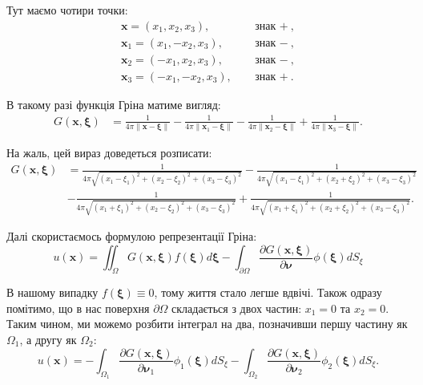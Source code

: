 \documentclass{hw_template}
\begin{document}
Тут маємо чотири точки:
\begin{align*}
    \mathbf{x} = (x_1,x_2,x_3), & \quad \text{знак $+$}, \\
    \mathbf{x}_1 = (x_1,-x_2,x_3), & \quad \text{знак $-$}, \\
    \mathbf{x}_2 = (-x_1,x_2,x_3), & \quad \text{знак $-$}, \\
    \mathbf{x}_3 = (-x_1,-x_2,x_3), & \quad \text{знак $+$}.
\end{align*}

В такому разі функція Гріна матиме вигляд:
\begin{align*}
    G(\mathbf{x}, \boldsymbol{\xi}) &= \frac{1}{4\pi\|\mathbf{x} - \boldsymbol{\xi}\|} - \frac{1}{4\pi\|\mathbf{x}_1 - \boldsymbol{\xi}\|} - \frac{1}{4\pi\|\mathbf{x}_2 - \boldsymbol{\xi}\|} + \frac{1}{4\pi\|\mathbf{x}_3 - \boldsymbol{\xi}\|}.
\end{align*}

На жаль, цей вираз доведеться розписати:
\begin{align*}
    G(\mathbf{x}, \boldsymbol{\xi}) &= \frac{1}{4\pi\sqrt{(x_1-\xi_1)^2 + (x_2-\xi_2)^2 + (x_3-\xi_3)^2}} - \frac{1}{4\pi\sqrt{(x_1-\xi_1)^2 + (x_2+\xi_2)^2 + (x_3-\xi_3)^2}} \\&- \frac{1}{4\pi\sqrt{(x_1+\xi_1)^2 + (x_2-\xi_2)^2 + (x_3-\xi_3)^2}} + \frac{1}{4\pi\sqrt{(x_1+\xi_1)^2 + (x_2+\xi_2)^2 + (x_3-\xi_3)^2}}.
\end{align*}

Далі скористаємось формулою репрезентації Гріна:
\begin{equation*}
    u(\mathbf{x}) = \iint_{\Omega} G(\mathbf{x}, \boldsymbol{\xi})f(\boldsymbol{\xi})d\boldsymbol{\xi} - \int_{\partial\Omega}\frac{\partial G(\mathbf{x}, \boldsymbol{\xi})}{\partial \boldsymbol{\nu}}\phi(\boldsymbol{\xi})dS_{\xi}
\end{equation*}

В нашому випадку $f(\boldsymbol{\xi})\equiv 0$, тому життя стало легше вдвічі. Також одразу помітимо, що в нас поверхня $\partial\Omega$ складається з двох частин: $x_1=0$ та $x_2=0$. Таким чином, ми можемо розбити інтеграл на два, позначивши першу частину як $\Omega_1$, а другу як $\Omega_2$:
\begin{equation*}
    u(\mathbf{x}) = -\int_{\Omega_1}\frac{\partial G(\mathbf{x}, \boldsymbol{\xi})}{\partial \boldsymbol{\nu}_1}\phi_1(\boldsymbol{\xi})dS_{\xi} - \int_{\Omega_2}\frac{\partial G(\mathbf{x}, \boldsymbol{\xi})}{\partial \boldsymbol{\nu}_2}\phi_2(\boldsymbol{\xi})dS_{\xi}.
\end{equation*}
\end{document}

